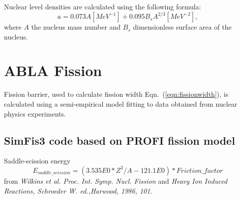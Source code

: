 Nuclear level densities are calculated using the following formula:
\begin{equation}
  a = 0.073 A  [MeV^{-1}] + 0.095  B_s  A^{2/3} [MeV^{-2}],
\label{eqn:leveldensity}
\end{equation}
where $A$ the nucleus mass number and $B_s$ dimensionless surface area
of the nucleus. 


\section{ABLA Fission}

Fission barrier, used to calculate fission width
Eqn.~(\ref{eqn:fissionwidth}), is calculated using a semi-empirical model
fitting to data obtained from nuclear physics experiments.

\subsection{SimFis3 code based on PROFI fission model}
\label{simfis3}


Saddle-scission energy
\begin{equation}
E_{saddle\_scission} = (3.535E0 * Z^2/A - 121.1E0) * Friction\_factor
\end{equation}
from \emph{Wilkins et al. Proc. Int. Symp. Nucl. Fission} and
\emph{Heavy Ion Induced Reactions, Schroeder W. ed.,Harwood, 1986,
  101}.

